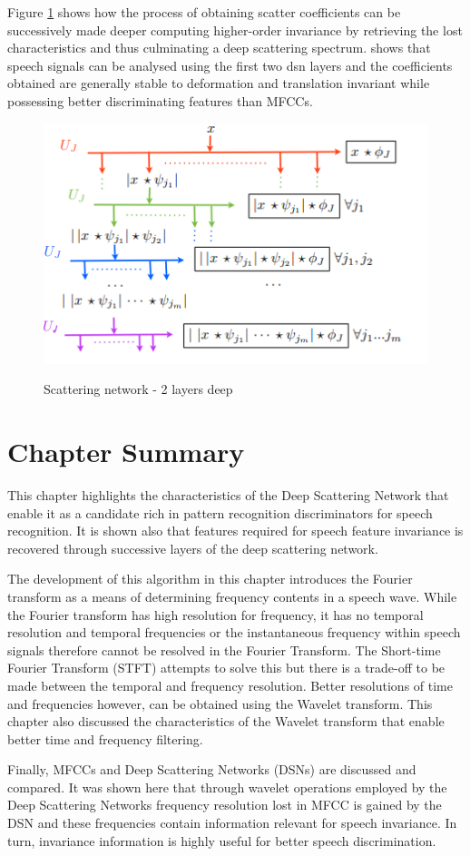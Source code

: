 Figure \ref{fig_c4_scatter} shows how the process of obtaining scatter coefficients can be successively made deeper computing higher-order invariance by retrieving the lost characteristics and thus culminating a deep scattering spectrum. \cite{anden2014deep} shows that speech signals can be analysed using the first two \acrshort{dsn} layers and the coefficients obtained are generally stable to deformation and translation invariant while possessing better discriminating features than MFCCs.
\begin{figure}
\centering
  \includegraphics[width=14cm]{thesis/images/scatter}\\
  \caption{Scattering network - 2 layers deep} \cite{anden2011multiscale}\label{fig_c4_scatter}
\end{figure}

\section{Chapter Summary}
This chapter highlights the characteristics of the Deep Scattering Network that enable it as a candidate rich in pattern recognition discriminators for speech recognition. It is shown also that features required for speech feature invariance is recovered through successive layers of the deep scattering network.  

The development of this algorithm in this chapter introduces the Fourier transform as a means of determining frequency contents in a speech wave.  While the Fourier transform has high resolution for frequency, it has no temporal resolution and temporal frequencies or the instantaneous frequency within speech signals therefore cannot be resolved in the Fourier Transform.   The Short-time Fourier Transform (STFT) attempts to solve this but there is a trade-off to be made between the temporal and frequency resolution.  Better resolutions of time and frequencies however, can be obtained using the Wavelet transform.  This chapter also discussed the characteristics of the Wavelet transform that enable better time and frequency filtering.

Finally, MFCCs and Deep Scattering Networks (DSNs) are discussed and compared. It was shown here that through wavelet operations employed by the Deep Scattering Networks frequency resolution lost in MFCC is gained by the DSN and these frequencies contain information relevant for speech invariance. In turn, invariance information is highly useful for better speech discrimination.